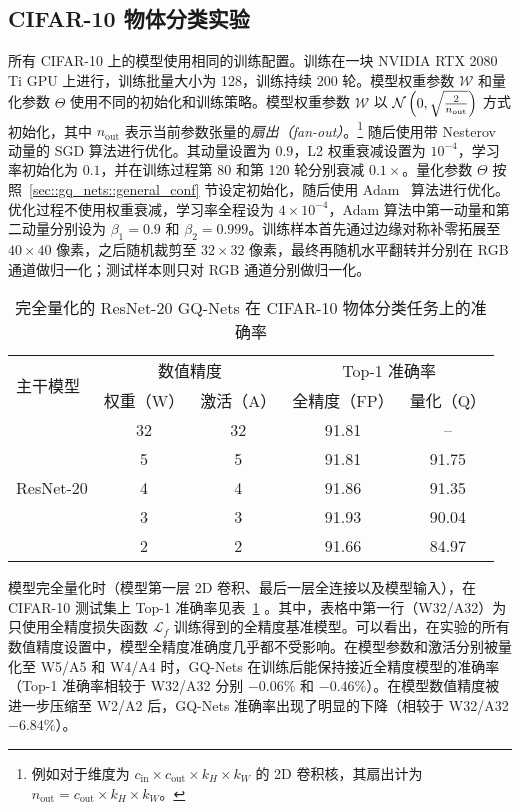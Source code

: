 \subsection{CIFAR-10 物体分类实验} \label{sec::gq_nets::cifar10_experiments}
所有 CIFAR-10 上的模型使用相同的训练配置。训练在一块 NVIDIA RTX 2080 Ti GPU 上进行，训练批量大小为 128，训练持续 200 轮。模型权重参数 $\mathcal{W}$ 和量化参数 $\Theta$ 使用不同的初始化和训练策略。模型权重参数 $\mathcal{W}$ 以 $\mathcal{N} \left( 0, \sqrt{\frac{2}{n_{\mathrm{out}}}} \right)$ 方式初始化，其中 $n_{\mathrm{out}}$ 表示当前参数张量的\emph{扇出（fan-out）}。\footnote{例如对于维度为 $c_{\mathrm{in}} \times c_{\mathrm{out}} \times k_H \times k_W$ 的 2D 卷积核，其扇出计为 $n_{\mathrm{out}}=c_{\mathrm{out}} \times k_H \times k_W$。} 随后使用带 Nesterov 动量的 SGD 算法进行优化。其动量设置为 $0.9$，L2 权重衰减设置为 $10^{-4}$，学习率初始化为 $0.1$，并在训练过程第 80 和第 120 轮分别衰减 $0.1\times$。量化参数 $\Theta$ 按照~\ref{sec::gq_nets::general_conf} 节设定初始化，随后使用 Adam~\citep{kingma2014adam} 算法进行优化。优化过程不使用权重衰减，学习率全程设为 $4\times 10^{-4}$，Adam 算法中第一动量和第二动量分别设为 $\beta_1 = 0.9$ 和 $\beta_2 = 0.999$。训练样本首先通过边缘对称补零拓展至 $40\times40$ 像素，之后随机裁剪至 $32\times 32$ 像素，最终再随机水平翻转并分别在 RGB 通道做归一化；测试样本则只对 RGB 通道分别做归一化。

\begin{table}[htb]
  \centering
  \caption{完全量化的 ResNet-20 GQ-Nets 在 CIFAR-10 物体分类任务上的准确率}
  \label{tab::gq_nets::cifar}
  \begin{tabular}{l *{4}{c}}
    \toprule
    \multirow{2}{*}{主干模型} & \multicolumn{2}{c}{数值精度} &\multicolumn{2}{c}{Top-1 准确率} \\
    & 权重（W） & 激活（A） & 全精度（FP） & 量化（Q） \\
    \midrule
    \multirow{5}{*}{ResNet-20} & 32 & 32 & 91.81 & -- \\
    & 5 & 5 & 91.81 & 91.75 \\
    & 4 & 4 & 91.86 & 91.35 \\
    & 3 & 3 & 91.93 & 90.04 \\
    & 2 & 2 & 91.66 & 84.97 \\
    \bottomrule
  \end{tabular}
\end{table}

模型完全量化时（模型第一层 2D 卷积、最后一层全连接以及模型输入），在 CIFAR-10 测试集上 Top-1 准确率见表~\ref{tab::gq_nets::cifar} 。其中，表格中第一行（W32/A32）为只使用全精度损失函数 $\mathcal{L}_f$ 训练得到的全精度基准模型。可以看出，在实验的所有数值精度设置中，模型全精度准确度几乎都不受影响。在模型参数和激活分别被量化至 W5/A5 和 W4/A4 时，GQ-Nets 在训练后能保持接近全精度模型的准确率（Top-1 准确率相较于 W32/A32 分别 $-0.06\%$ 和 $-0.46\%$）。在模型数值精度被进一步压缩至 W2/A2 后，GQ-Nets 准确率出现了明显的下降（相较于 W32/A32 $-6.84\%$）。

